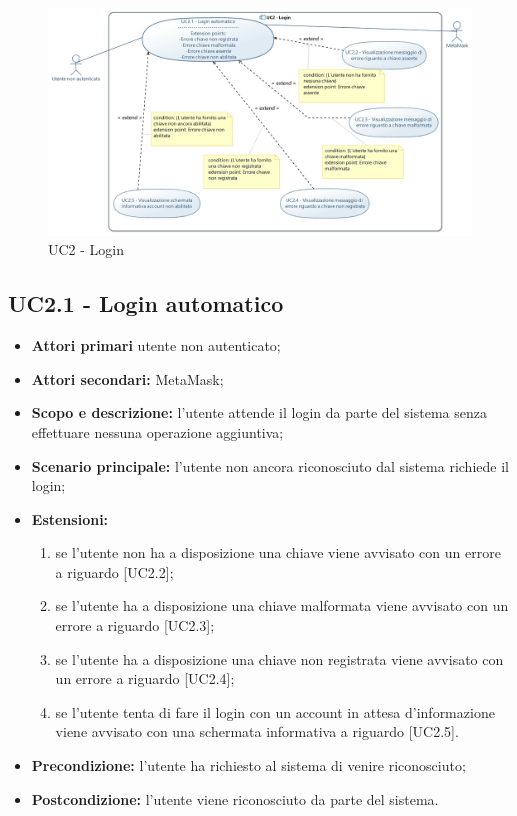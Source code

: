 \documentclass[AnalisiDeiRequisiti.tex]{subfiles}
\begin{document}
\begin{figure}[H]
	\centering
	\includegraphics[width=1.0\linewidth]{UC2.jpg}
	\caption{UC2 - Login}
	\label{fig:UC2 - Login}
\end{figure}

\subsection{UC2.1 - Login automatico}
\begin{itemize}
\item \textbf{Attori primari} utente non autenticato;\\
\item \textbf{Attori secondari:} MetaMask;\\
\item \textbf{Scopo e descrizione:} l'utente attende il login da parte del sistema senza effettuare nessuna operazione aggiuntiva;\\
\item \textbf{Scenario principale:} l'utente non ancora riconosciuto dal sistema richiede il login;\\
\item \textbf{Estensioni:}\\
\begin{enumerate}
	\item se l'utente non ha a disposizione una chiave viene avvisato con un errore a riguardo [UC2.2];
	\item se l'utente ha a disposizione una chiave malformata viene avvisato con un errore a riguardo [UC2.3];
	\item se l'utente ha a disposizione una chiave non registrata viene avvisato con un errore a riguardo [UC2.4];
	\item se l'utente tenta di fare il login con un account in attesa d'informazione viene avvisato con una schermata informativa a riguardo [UC2.5].
\end{enumerate}
\item \textbf{Precondizione:} l'utente ha richiesto al sistema di venire riconosciuto;\\
\item \textbf{Postcondizione:} l'utente viene riconosciuto da parte del sistema.\\
\end{itemize}
\end{document}
